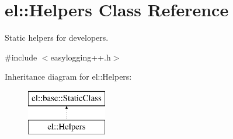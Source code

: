 \hypertarget{classel_1_1_helpers}{}\section{el\+:\+:Helpers Class Reference}
\label{classel_1_1_helpers}


Static helpers for developers.  




{\ttfamily \#include $<$easylogging++.\+h$>$}

Inheritance diagram for el\+:\+:Helpers\+:\begin{figure}[H]
\begin{center}
\leavevmode
\includegraphics[height=2.000000cm]{classel_1_1_helpers}
\end{center}
\end{figure}
